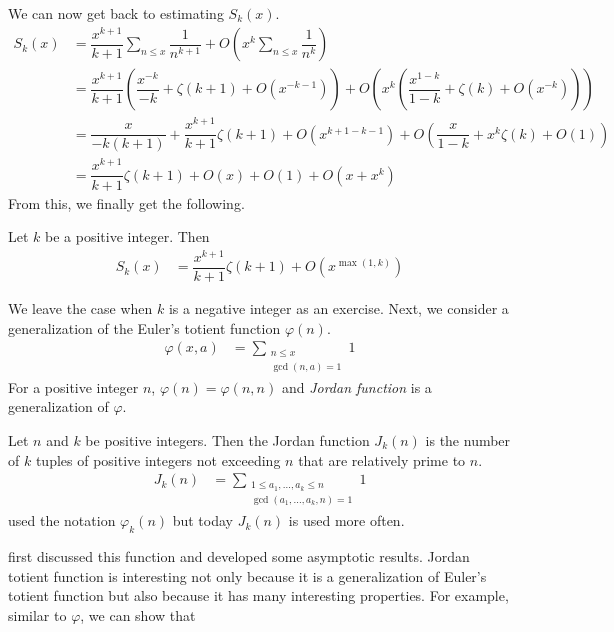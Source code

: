 \documentclass[elemannt.tex]{subfile}
\begin{document}
	We can now get back to estimating $S_{k}(x)$.
		\begin{align*}
			S_{k}(x)
				& = \dfrac{x^{k+1}}{k+1}\sum_{n\leq x}\dfrac{1}{n^{k+1}}+O\left(x^{k}\sum_{n\leq x}\dfrac{1}{n^{k}}\right)\\
				& = \dfrac{x^{k+1}}{k+1}\left(\dfrac{x^{-k}}{-k}+\zeta(k+1)+O(x^{-k-1})\right)+O\left(x^{k}\left(\dfrac{x^{1-k}}{1-k}+\zeta(k)+O(x^{-k})\right)\right)\\
				& = \dfrac{x}{-k(k+1)}+\dfrac{x^{k+1}}{k+1}\zeta(k+1)+O(x^{k+1-k-1})+O\left(\dfrac{x}{1-k}+x^{k}\zeta(k)+O(1)\right)\\
				& = \dfrac{x^{k+1}}{k+1}\zeta(k+1)+O(x)+O(1)+O(x+x^{k})
		\end{align*}
	From this, we finally get the following.
		\begin{theorem}
			Let $k$ be a positive integer. Then
				\begin{align*}
					S_{k}(x)
						& = \dfrac{x^{k+1}}{k+1}\zeta(k+1)+O(x^{\max(1,k)})
				\end{align*}
		\end{theorem}
	We leave the case when $k$ is a negative integer as an exercise. Next, we consider a generalization of the Euler's totient function $\varphi(n)$.
		\begin{align*}
			\varphi(x,a)
				& = \sum_{\substack{n\leq x\\\gcd(n,a)=1}}1
		\end{align*}
	For a positive integer $n$, $\varphi(n)=\varphi(n,n)$ and \textit{Jordan function} is a generalization of $\varphi$.
		\begin{definition}
			Let $n$ and $k$ be positive integers. Then the Jordan function $J_{k}(n)$ is the number of $k$ tuples of positive integers not exceeding $n$ that are relatively prime to $n$.
				\begin{align*}
					J_{k}(n)
						& = \sum_{\substack{1\leq a_{1},\ldots,a_{k}\leq n\\\gcd(a_{1},\ldots,a_{k},n)=1}}1
				\end{align*}
			\textcite{lehmer_1900} used the notation $\varphi_{k}(n)$ but today $J_{k}(n)$ is used more often.
		\end{definition}
	\textcite[Page $95-97$]{jordan_1989} first discussed this function and \textcite{lehmer_1900} developed some asymptotic results. Jordan totient function is interesting not only because it is a generalization of Euler's totient function but also because it has many interesting properties.
	For example, similar to $\varphi$, we can show that
\end{document}
